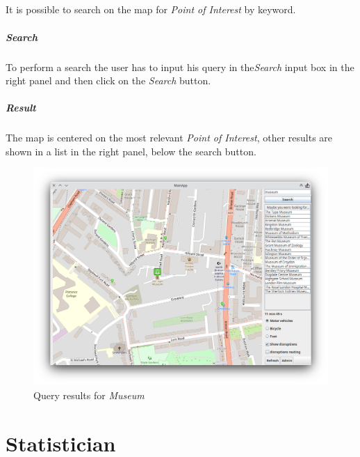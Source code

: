 \paragraph{}
It is possible to search on the map for \textit{Point of Interest} by keyword.

\paragraph{Search}
To perform a search the user has to input his query in the\textit{Search} input 
box in the right panel and then click on the \textit{Search} button.

\paragraph{Result}
The map is centered on the most relevant \textit{Point of Interest}, other 
results are shown in a list in the right panel, below the search button.

\begin{figure}[H]
	\centering
	\includegraphics[width=\linewidth]{assets/mainapp4.png}
	\caption[]{
		Query results for \textit{Museum}
	}
	\label{fig:mainappdialog4}
\end{figure}

\chapter{Statistician}


